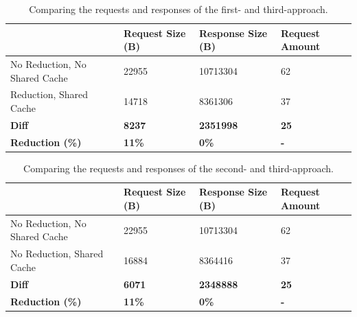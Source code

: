 \begin{table}[H]
    \begin{tabular}{|l|l|l|l|}
    \hline
                                    & Request Size (B) & Response Size (B) & Request Amount  \\
    \hline
     No Reduction, No Shared Cache     &  22955        &  10713304   & 62 \\
     \hline
     Reduction, Shared Cache        &  14718        &  8361306   & 37 \\
     \hline
     \hline
    \textbf{Diff}                   & \textbf{8237} & \textbf{2351998} & \textbf{25} \\
    \hline
    \textbf{Reduction (\%)} & \textbf{11\%} & \textbf{0\%} & \textbf{-} \\
     \hline
    \end{tabular}
    \caption{Comparing the requests and responses of the first- and third-approach.}
    \label{tab:serious-game-comparison}
\end{table}

\begin{table}[H]
    \begin{tabular}{|l|l|l|l|}
    \hline
                                    & Request Size (B) & Response Size (B) & Request Amount  \\
    \hline
     No Reduction, No Shared Cache     &  22955        &  10713304   & 62 \\
     \hline
     No Reduction, Shared Cache        &  16884        &  8364416   & 37 \\
     \hline
     \hline
    \textbf{Diff}                   & \textbf{6071} & \textbf{2348888} & \textbf{25} \\
    \hline
    \textbf{Reduction (\%)} & \textbf{11\%} & \textbf{0\%} & \textbf{-} \\
     \hline
    \end{tabular}
    \caption{Comparing the requests and responses of the second- and third-approach.}
    \label{tab:serious-game-comparison}
\end{table}
